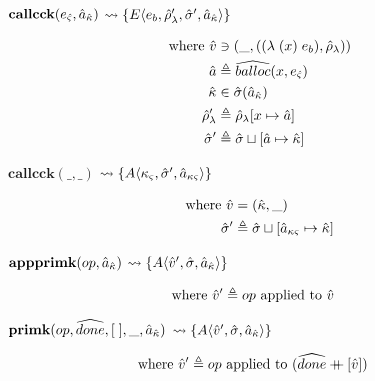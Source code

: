 \documentclass[12pt,draft]{article}
\newcommand\mdoubleplus{\ensuremath{\mathbin{+\mkern-9mu+}}}
\newcommand{\singlelamsyn}[2]{(\lambda\;(#1)\;#2)}
\newcommand{\E}[4]{E\langle #1 , #2 , #3 , #4 \rangle}
\newcommand{\A}[3]{A\langle #1 , #2 , #3 \rangle}
\begin{document}
\begin{multicols*}{2}
\vfill\null
\columnbreak


\begin{center}
  $\textbf{callcck}(e_{\hat{\varsigma}} , \hat{a}_{\hat{\kappa}})$
  $\leadsto \{\E{e_b}{\aenv_{\lambda}'}{\astore'}{\akaddr}\}$
\end{center}
\vspace{-7mm}
\begin{align*}
  \text{where }
  \aval &\ni (\_ , (\singlelamsyn{x}{e_b} , \aenv_{\lambda})) \\
  \abaddr &\triangleq \aballoc{x , \ectrl} \\
  \akont &\in \astore(\akaddr) \\
  \aenv_{\lambda}' &\triangleq \aenv_{\lambda}[x \mapsto \abaddr] \\
  \astore' &\triangleq \astore \sqcup [\abaddr \mapsto \akont]
\end{align*}
\begin{center}
  $\textbf{callcck}(\_, \_)$
  $\leadsto \{\A{\actrlkont}{\astore'}{\actrladdr}\}$
\end{center}
\vspace{-7mm}
\begin{align*}
  \text{where }
  \hat{v} &= (\hat{\kappa} , \_) \\
  \hat{\sigma}' &\triangleq \hat{\sigma} \sqcup [\hat{a}_{\kappa\varsigma} \mapsto \hat{\kappa}]
\end{align*}
\begin{center}
  $\textbf{appprimk}(op, \hat{a}_{\hat{\kappa}})$
  $\leadsto \{\A{\aval'}{\astore}{\akaddr}\}$
\end{center}
\vspace{-7mm}
\begin{align*}
  \text{where } \hat{v}' &\triangleq op \text{ applied to } \hat{v}
\end{align*}
\begin{center}
  $\textbf{primk}(op, \widehat{done}, [\;], \_, \hat{a}_{\hat{\kappa}})$
  $\leadsto \{\A{\aval'}{\astore}{\akaddr}\}$
\end{center}
\vspace{-7mm}
\begin{align*}
  \text{where }\aval'&\triangleq op\text{ applied to }(\adone \mdoubleplus [\aval])

\end{align*}
\end{multicols*}
\end{document}
